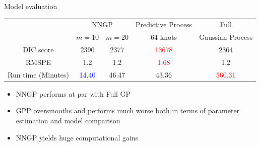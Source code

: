 \begin{frame}{Model evaluation}
	\begin{table}[]
		\centering
		{\scriptsize
			\begin{tabular}{ccccc}
				\hline
				&\multicolumn{2}{c}{NNGP} &Predictive Process &Full\\
				&$m=10$ & $m=20$           &64 knots          & Gaussian Process \\ 
				\hline
				DIC score &2390&2377&\textcolor{red}{13678}&2364\\
				RMSPE &1.2&1.2&\textcolor{red}{1.68}&1.2\\  \hline
				Run time (Minutes) &\textcolor{blue}{14.40}&46.47&43.36&\textcolor{red}{560.31}\\
				\hline
			\end{tabular}
		}
	\end{table}
	
	\begin{itemize}
		\item NNGP performs at par with Full GP
		\item GPP oversmooths and performs much worse both in terms of parameter estimation and model comparison
		\item NNGP yields huge computational gains
	\end{itemize}
\end{frame}

